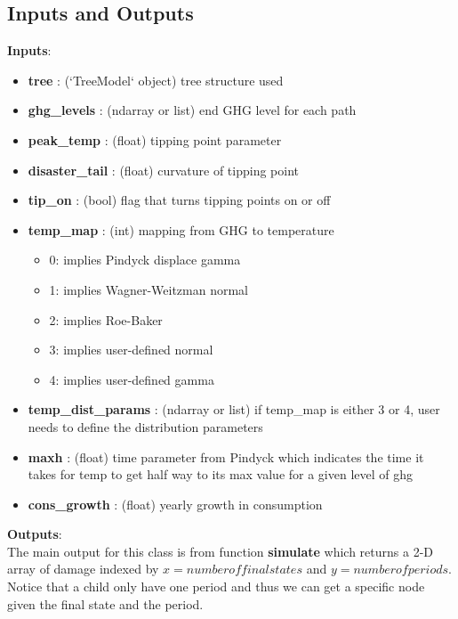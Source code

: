 \documentclass[12pt]{article}
\begin{document}
\subsection{Inputs and Outputs}
\textbf{Inputs}:
    \begin{itemize}
      \item \textbf{tree} : (`TreeModel` object)
        tree structure used
      \item   \textbf{ghg\_levels} : (ndarray or list)
        end GHG level for each path
      \item     \textbf{peak\_temp} : (float)
        tipping point parameter
      \item    \textbf{disaster\_tail} : (float)
        curvature of tipping point
      \item     \textbf{tip\_on} : (bool)
        flag that turns tipping points on or off
      \item     \textbf{temp_map} : (int)
        mapping from GHG to temperature
        \begin{itemize}
          \item 0: implies Pindyck displace gamma
          \item 1: implies Wagner-Weitzman normal
          \item 2: implies Roe-Baker
          \item 3: implies user-defined normal
          \item 4: implies user-defined gamma
        \end{itemize}
      \item     \textbf{temp\_dist\_params} : (ndarray or list)
        if temp\_map is either 3 or 4, user needs to define the distribution parameters
      \item     \textbf{maxh} : (float)
        time parameter from Pindyck which indicates the time it takes for temp to get half way to its max value for a given level of ghg
      \item     \textbf{cons\_growth} : (float)
        yearly growth in consumption
    \end{itemize}
\textbf{Outputs}:\\
The main output for this class is from function \textbf{simulate} which returns a 2-D array of damage indexed by $ x = number of final states$ and $ y = number of periods$. Notice that a child only have one period and thus we can get a specific node given the final state and the period.
\end{document}
